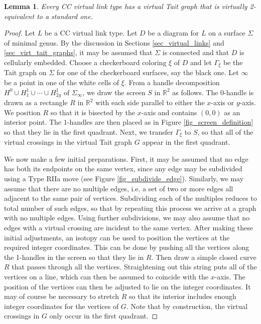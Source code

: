 \documentclass[11pt, twoside]{amsart}
\numberwithin{equation}{section}
\newtheorem{lemma}[theorem]{Lemma}
\theoremstyle{definition}
\numberwithin{equation}{section}
\begin{document}
\begin{lemma} \label{lemma_prepare_standard} Every CC virtual link type has a virtual Tait graph that is virtually 2-equivalent to a standard one. 
\end{lemma}

\begin{proof} Let $L$ be a CC virtual link type. Let $D$ be a diagram for $L$ on a surface $\Sigma$ of minimal genus. By the discussion in Sections \ref{sec_virtual_links} and \ref{sec_virt_tait_graphs}, it may be assumed that $\Sigma$ is connected and that $D$ is cellularly embedded. Choose a checkerboard coloring $\xi$ of $D$ and let $\Gamma_{\xi}$ be the Tait graph on $\Sigma$ for one of the checkerboard surfaces, say the black one. Let $\infty$ be a point in one of the white cells of $\xi$. From a handle decomposition $H^0 \cup H^1_1 \cup \cdots \cup H^{1}_{2g}$ of $\Sigma_{\infty}$, we draw the screen $S$ in $\mathbb{R}^2$ as follows. The $0$-handle is drawn as a rectangle $R$ in $\mathbb{R}^2$ with each side parallel to either the $x$-axis or $y$-axis. We position $R$ so that it is bisected by the $x$-axis and contains $(0,0)$ as an interior point. The $1$-handles are then placed as in Figure \ref{fig_screen_definition} so that they lie in the first quadrant. Next, we transfer $\Gamma_{\xi}$ to $S$, so that all of the virtual crossings in the virtual Tait graph $G$ appear in the first quadrant.


We now make a few initial preparations. First, it may be assumed that no edge has both its endpoints on the same vertex, since any edge may be subdivided using a Type RIIa move (see Figure \ref{fig_subdivide_edge}). Similarly, we may assume that there are no multiple edges, i.e. a set of two or more edges all adjacent to the same pair of vertices. Subdividing each of the multiples reduces to total number of such edges, so that by repeating this process we arrive at a graph with no multiple edges. Using further subdivisions, we may also assume that no edges with a virtual crossing are incident to the same vertex. After making these initial adjustments, an isotopy can be used to position the vertices at the required integer coordinates. This can be done by pushing all the vertices along the 1-handles in the screen so that they lie in $R$. Then draw a simple closed curve $R$ that passes through all the vertices. Straightening out this string puts all of the vertices on a line, which can then be assumed to coincide with the $x$-axis. The position of the vertices can then be adjusted to lie on the integer coordinates. It may of course be necessary to stretch $R$ so that its interior includes enough integer coordinates for the vertices of $G$. Note that by construction, the virtual crossings in $G$ only occur in the first quadrant.


\end{proof}
\end{document}

